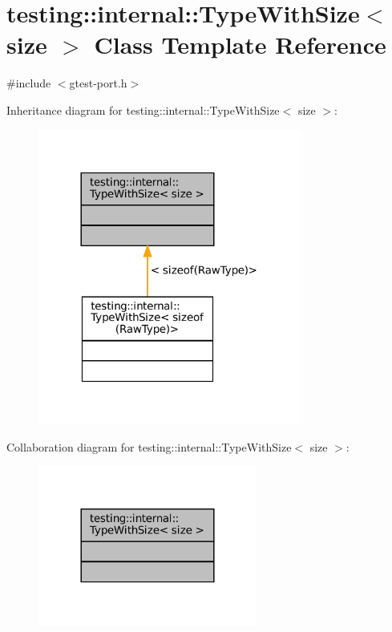 \hypertarget{classtesting_1_1internal_1_1TypeWithSize}{}\section{testing\+:\+:internal\+:\+:Type\+With\+Size$<$ size $>$ Class Template Reference}
\label{classtesting_1_1internal_1_1TypeWithSize}


{\ttfamily \#include $<$gtest-\/port.\+h$>$}



Inheritance diagram for testing\+:\+:internal\+:\+:Type\+With\+Size$<$ size $>$\+:
\nopagebreak
\begin{figure}[H]
\begin{center}
\leavevmode
\includegraphics[width=245pt]{classtesting_1_1internal_1_1TypeWithSize__inherit__graph}
\end{center}
\end{figure}


Collaboration diagram for testing\+:\+:internal\+:\+:Type\+With\+Size$<$ size $>$\+:
\nopagebreak
\begin{figure}[H]
\begin{center}
\leavevmode
\includegraphics[width=204pt]{classtesting_1_1internal_1_1TypeWithSize__coll__graph}
\end{center}
\end{figure}
